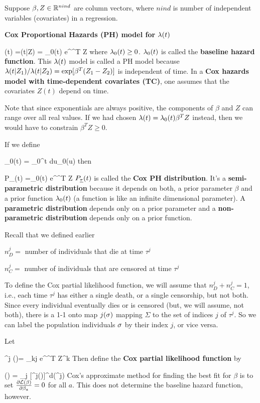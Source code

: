 Suppose $\beta, Z\in { \mathbb{R}}^{nind}$ are
column vectors, where $nind$ is
number of independent variables (covariates)
in a regression.

{\bf Cox Proportional Hazards (PH) model for
$\lambda(t)$}

\beq
\lam(t) =\lam(t|Z) = \lam_0(t) e^{\beta^T Z}
\eeq
where $\lambda_0(t)\geq 0$.
$\lambda_0(t)$
is called the {\bf baseline
hazard function}.
This $\lambda(t)$  model is called a
PH model because
$\lambda(t|Z_1)/\lambda(t|Z_2)=
\exp[\beta^T(Z_1-Z_2)]$
is independent of time.
In a {\bf Cox hazards model with time-dependent covariates (TC)},
one assumes that the covariates
$Z(t)$ depend on time.

Note that since exponentials
are always positive, the components
of $\beta$ and $Z$ can
range over all real values.
If we had chosen
$\lambda(t) = \lambda_0(t)\beta^T Z$
instead, then we would have
to constrain $\beta^TZ\geq 0$.

If we define

\beq
\Lambda_0(t) = \int_0^t du\;\lam_0(u)
\eeq
then

\beq
P_\rvtau(t) =\lam_0(t) e^{\beta^T Z} 
\eeq
$P_{\underline{\tau}}(t)$ is called the {\bf Cox PH distribution}.
It's a {\bf semi-parametric distribution}
because it depends on both, a prior
parameter $\beta$ and a prior function $\lambda_0(t)$
(a function is like an infinite dimensional parameter).
A {\bf parametric  distribution}
depends only on a prior parameter and
a {\bf non-parametric  distribution}
depends only on a prior function.

Recall that we defined earlier

$n_D^j=$ number of individuals
that die  at time $\tau^j$


$n_C^j=$ number of individuals
that are censored at time $\tau^j$


To define the Cox partial likelihood function,
we will assume that $n^j_D + n^j_C =1$, i.e.,
each time $\tau^j$ has either
a single death, or a single censorship, but not both.
Since every individual
eventually dies or is censored (but, we will assume, not both),
there is a 1-1 onto map $j(\sigma)$ mapping $\Sigma$ to the set
of indices $j$ of $\tau^j$. So we can label the population individuals
$\sigma$ by
their index $j$, or vice versa.

Let

\beq
\call^j (\beta)=
{\sum_{k\geq j} e^{\beta^T Z^{k}}}
\eeq
Then define the {\bf Cox partial likelihood function} by


\beq
\call(\beta) = \prod_j [\call^j(\beta)]^{{d(\tau^j})}
\eeq
Cox's approximate method for finding
the best fit for $\beta$
is to set $
\frac{\partial{\cal L}(\beta)}{\partial\beta_a} =0$
for all $a$. This does not determine the
baseline hazard function, however.

